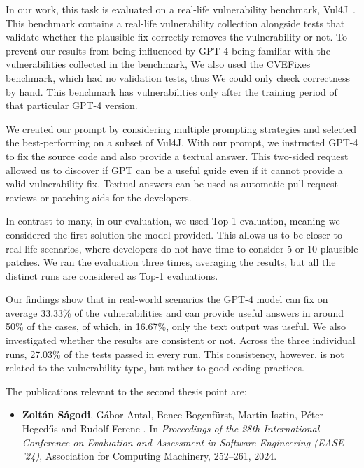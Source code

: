 \documentclass[12pt,a4paper]{extarticle}
\begin{document}
In our work, this task is evaluated on a real-life vulnerability benchmark, Vul4J~\cite{vul4j}.
This benchmark contains a real-life vulnerability collection alongside tests that validate whether the plausible fix correctly removes the vulnerability or not.
To prevent our results from being influenced by GPT-4 being familiar with the vulnerabilities collected in the benchmark, We also used the CVEFixes~\cite{bhandari2021cvefixes} benchmark, which had no validation tests, thus We could only check correctness by hand.
This benchmark has vulnerabilities only after the training period of that particular GPT-4 version.

We created our prompt by considering multiple prompting strategies and selected the best-performing on a subset of Vul4J.
With our prompt, we instructed GPT-4 to fix the source code and also provide a textual answer.
This two-sided request allowed us to discover if GPT can be a useful guide even if it cannot provide a valid vulnerability fix.
Textual answers can be used as automatic pull request reviews or patching aids for the developers.

In contrast to many, in our evaluation, we used Top-1 evaluation, meaning we considered the first solution the model provided.
This allows us to be closer to real-life scenarios, where developers do not have time to consider 5 or 10 plausible patches.
We ran the evaluation three times, averaging the results, but all the distinct runs are considered as Top-1 evaluations.

Our findings show that in real-world scenarios the GPT-4 model can fix on average 33.33\% of the vulnerabilities and can provide useful answers in around 50\% of the cases, of which, in 16.67\%, only the text output was useful.
We also investigated whether the results are consistent or not.
Across the three individual runs, 27.03\% of the tests passed in every run.
This consistency, however, is not related to the vulnerability type, but rather to good coding practices.

\vspace{2em}

The publications relevant to the second thesis point are:
\begin{itemize}
	\item \textbf{Zoltán Ságodi}, Gábor Antal, Bence Bogenfürst, Martin Isztin, Péter Heged\H{u}s and Rudolf Ferenc
	.
	\newblock In \emph{Proceedings of the 28th International Conference on Evaluation and Assessment in Software Engineering (EASE '24)}, Association for Computing Machinery, 252–261, 2024.
\end{itemize}
\end{document}
